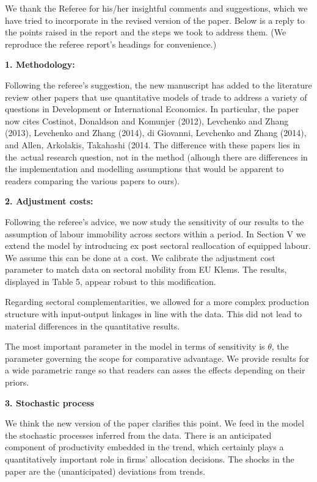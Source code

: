 \documentclass[12pt]{article}
\begin{document}
We thank the Referee for his/her insightful comments and suggestions, which
we have tried to incorporate in the revised version of the paper. Below is a
reply to the points raised in the report and the steps we took to address
them. (We reproduce the referee report's headings for convenience.)\bigskip

\textbf{1. Methodology: }

Following the referee's suggestion, the new manuscript has added to the
literature review other papers that use quantitative models of trade to
address a variety of questions in Development or International Economics. In
particular, the paper now cites Costinot, Donaldson and Komunjer (2012),
Levchenko and Zhang (2013), Levchenko and Zhang (2014), di Giovanni,
Levchenko and Zhang (2014), and Allen,  Arkolakis, Takahashi (2014. The
difference with these papers lies in the\ actual research question, not in
the method (alhough there are differences in the implementation and
modelling assumptions that would be apparent to readers comparing the
various papers to ours).\bigskip 

\textbf{2. Adjustment costs:}

Following the referee's advice, we now study the sensitivity of our results
to the assumption of labour immobility across sectors within a period. In
Section V we extend the model by introducing ex post sectoral reallocation
of equipped labour. We assume this can be done at a cost. We calibrate the
adjustment cost parameter to match data on sectoral mobility from EU Klems.
The results, displayed in Table 5, appear robust to this modification.

Regarding sectoral complementarities, we allowed for a more complex
production structure with input-output linkages in line with the data. This
did not lead to material differences in the quantitative results. 

The most important parameter in the model in terms of sensitivity is $\theta 
$, the parameter governing the scope for comparative advantage. We provide
results for a wide parametric range so that readers can asses the effects
depending on their priors.\bigskip 

\textbf{3. Stochastic process}

We think the new version of the paper clarifies this point. We feed in the
model the stochastic processes inferred from the data. There is an
anticipated component of productivity embedded in the trend, which certainly
plays a quantitatively important role in firms' allocation decisions. The
shocks in the paper are the (unanticipated) deviations from trends.\bigskip 
\end{document}
